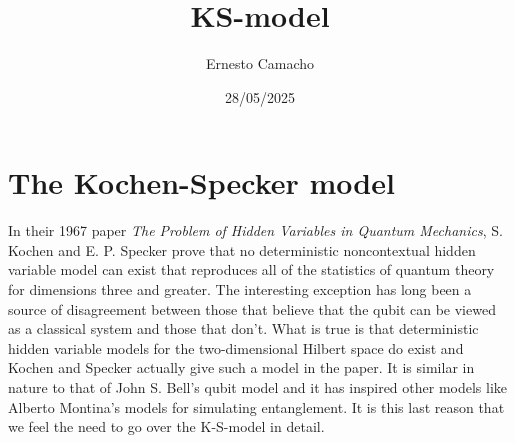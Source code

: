 \documentclass[12pt,draft]{article}
\title{KS-model}
\author{Ernesto Camacho}
\date{28/05/2025}
\theoremstyle{definition}
\theoremstyle{plain}
\begin{document}
    \maketitle

    \section{The Kochen-Specker model}

    In their 1967 paper \textit{The Problem of Hidden
    Variables in Quantum Mechanics}, S. Kochen and E. P.
    Specker prove that no deterministic noncontextual hidden
    variable model can exist that reproduces all of the
    statistics of quantum theory for dimensions three and
    greater. The interesting exception has long been a
    source of disagreement between those that believe that
    the qubit can be viewed as a classical system and those
    that don't. What is true is that deterministic hidden
    variable models for the two-dimensional Hilbert space do
    exist and Kochen and Specker actually give such a model
    in the paper. It is similar in nature to that of John S.
    Bell's qubit model and it has inspired other models like
    Alberto Montina's models for simulating entanglement. It
    is this last reason that we feel the need to go over the
    K-S-model in detail.
\end{document}
